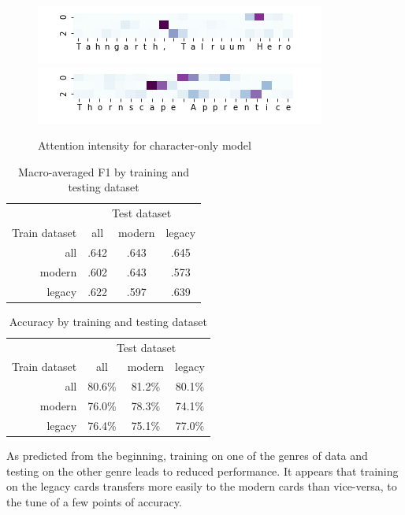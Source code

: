 \documentclass[letterpaper]{article} %
\begin{document}
\begin{figure}
  \includegraphics[width=.5\textwidth]{tahngarth-attention-char}
  \includegraphics[width=.5\textwidth]{thornscape-attention-char}
  \caption{Attention intensity for character-only model}
\end{figure}

\begin{table}
  \centering
  \caption{Macro-averaged F1 by training and testing dataset}
  \begin{tabular}{r | c | c | c}
    & \multicolumn{3}{c}{Test dataset}\\
    \cline{2-4}
    Train dataset & all & modern & legacy \\
    \hline
    all    & .642 & .643 & .645 \\
    modern & .602 & .643 & .573 \\
    legacy & .622 & .597 & .639 \\
  \end{tabular}
\end{table}

\begin{table}
  \centering
  \caption{Accuracy by training and testing dataset}
  \begin{tabular}{r | c | c | c}
    & \multicolumn{3}{c}{Test dataset}\\
    \cline{2-4}
    Train dataset & all & modern & legacy \\
    \hline
    all    & 80.6\% & 81.2\% & 80.1\% \\
    modern & 76.0\% & 78.3\% & 74.1\% \\
    legacy & 76.4\% & 75.1\% & 77.0\% \\
  \end{tabular}
\end{table}

As predicted from the beginning,
training on one of the genres of data
and testing on the other genre leads to reduced performance.
It appears that training on the legacy cards
transfers more easily to the modern cards
than vice-versa,
to the tune of a few points of accuracy.




\end{document}
